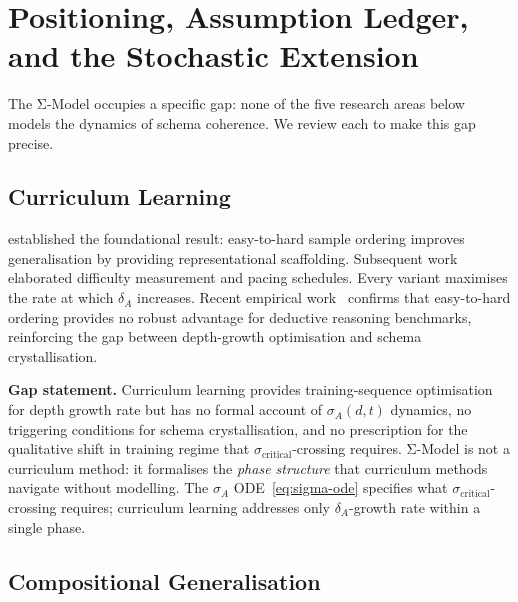 \documentclass[11pt]{article}
\theoremstyle{definition}
\theoremstyle{plain}
\begin{document}


\section{Positioning, Assumption Ledger, and the Stochastic Extension}\label{sec:positioning}

The Σ-Model occupies a specific gap: none of the five research areas below models the dynamics of schema coherence. We review each to make this gap precise.

\subsection{Curriculum Learning}\label{sec:curriculum-learning}

\cite{bengio2009curriculumlearning} established the foundational result:
easy-to-hard sample ordering improves generalisation by providing
representational scaffolding. Subsequent work elaborated difficulty
measurement \citep{kumar2010selfpacedlearning,portelas2020automaticcurriculumlearningdeep,
narvekar2020curriculumlearningreinforcementlearning} and pacing schedules.
Every variant maximises the rate at which $\delta_A$ increases.
Recent empirical work~\cite{mordig2026rethinkingeasytohard} confirms
that easy-to-hard ordering provides no robust advantage for
deductive reasoning benchmarks, reinforcing the gap between
depth-growth optimisation and schema crystallisation.

\textbf{Gap statement.} Curriculum learning provides training-sequence
optimisation for depth growth rate but has no formal account of
$\sigma_A(d,t)$ dynamics, no triggering conditions for schema
crystallisation, and no prescription for the qualitative shift in
training regime that $\sigma_{\text{critical}}$-crossing requires. Σ-Model
is not a curriculum method: it formalises the \emph{phase structure} that
curriculum methods navigate without modelling. The
$\sigma_A$ ODE~\eqref{eq:sigma-ode} specifies what
$\sigma_{\text{critical}}$-crossing requires; curriculum learning
addresses only $\delta_A$-growth rate within a single phase.

\subsection{Compositional Generalisation}\label{sec:compositional-generalisation}
\end{document}
